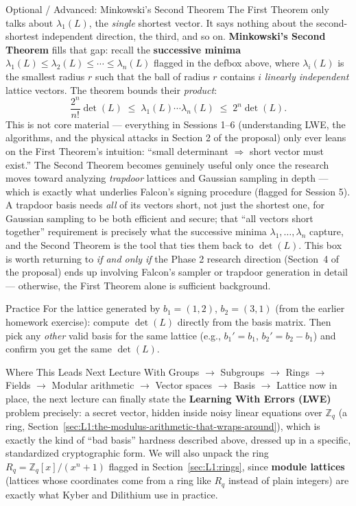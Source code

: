 \begin{previewbox}{Optional / Advanced: Minkowski's Second Theorem}
The First Theorem only talks about $\lambda_1(L)$, the \emph{single} shortest vector. It says nothing about the second-shortest independent direction, the third, and so on. \textbf{Minkowski's Second Theorem} fills that gap: recall the \textbf{successive minima} $\lambda_1(L) \le \lambda_2(L) \le \cdots \le \lambda_n(L)$ flagged in the defbox above, where $\lambda_i(L)$ is the smallest radius $r$ such that the ball of radius $r$ contains $i$ \emph{linearly independent} lattice vectors. The theorem bounds their \emph{product}:
$$
\frac{2^n}{n!}\det(L) \;\le\; \lambda_1(L)\cdots\lambda_n(L) \;\le\; 2^n \det(L).
$$
This is not core material --- everything in Sessions 1--6 (understanding LWE, the algorithms, and the physical attacks in Section 2 of the proposal) only ever leans on the First Theorem's intuition: ``small determinant $\Rightarrow$ short vector must exist.'' The Second Theorem becomes genuinely useful only once the research moves toward analyzing \emph{trapdoor} lattices and Gaussian sampling in depth --- which is exactly what underlies Falcon's signing procedure (flagged for Session 5). A trapdoor basis needs \emph{all} of its vectors short, not just the shortest one, for Gaussian sampling to be both efficient and secure; that ``all vectors short together'' requirement is precisely what the successive minima $\lambda_1,\ldots,\lambda_n$ capture, and the Second Theorem is the tool that ties them back to $\det(L)$. This box is worth returning to \emph{if and only if} the Phase 2 research direction (Section~4 of the proposal) ends up involving Falcon's sampler or trapdoor generation in detail --- otherwise, the First Theorem alone is sufficient background.
\end{previewbox}

\begin{exercisebox}{Practice}
For the lattice generated by $b_1 = (1,2)$, $b_2 = (3,1)$ (from the earlier homework exercise): compute $\det(L)$ directly from the basis matrix. Then pick any \emph{other} valid basis for the same lattice (e.g., $b_1' = b_1$, $b_2' = b_2 - b_1$) and confirm you get the same $\det(L)$.
\end{exercisebox}

\begin{previewbox}{Where This Leads Next Lecture}
With Groups $\to$ Subgroups $\to$ Rings $\to$ Fields $\to$ Modular arithmetic $\to$ Vector spaces $\to$ Basis $\to$ Lattice now in place, the next lecture can finally state the \textbf{Learning With Errors (LWE)} problem precisely: a secret vector, hidden inside noisy linear equations over $\mathbb{Z}_q$ (a ring, Section~\ref{sec:L1:the-modulus-arithmetic-that-wraps-around}), which is exactly the kind of ``bad basis'' hardness described above, dressed up in a specific, standardized cryptographic form. We will also unpack the ring $R_q = \mathbb{Z}_q[x]/(x^n+1)$ flagged in Section~\ref{sec:L1:rings}, since \textbf{module lattices} (lattices whose coordinates come from a ring like $R_q$ instead of plain integers) are exactly what Kyber and Dilithium use in practice.
\end{previewbox}

